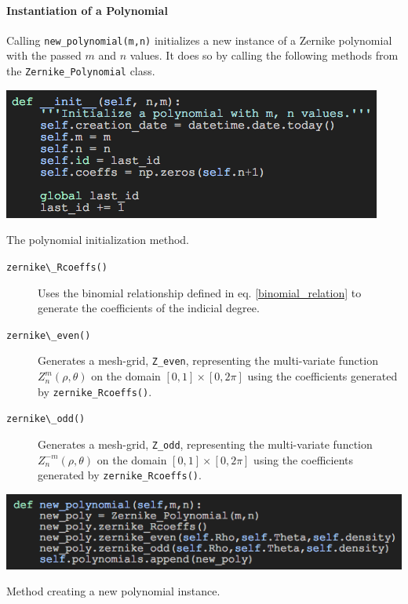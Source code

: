 \documentclass{tufte-handout}
\begin{document}
\paragraph{Instantiation of a Polynomial}
Calling \Verb|new_polynomial(m,n)| initializes a new instance of a Zernike polynomial with the passed $m$ and $n$ values.  It does so by calling the following methods from the \Verb|Zernike_Polynomial| class.

\begin{marginfigure}%
  \includegraphics[width=\linewidth]{img/init.png}
  \caption{The polynomial initialization method.}
  \label{fig:init}
\end{marginfigure}

\begin{description}
\item[\Verb|zernike\_Rcoeffs()|] Uses the binomial relationship defined in eq. \ref{binomial_relation} to generate the coefficients of the indicial degree.
\item[\Verb|zernike\_even()|] Generates a mesh-grid, \Verb|Z_even|, representing the multi-variate function $Z_n^m(\rho,\theta)$ on the domain $[0, 1] \times [0, 2\pi]$ using the coefficients generated by \Verb|zernike_Rcoeffs()|.
\item[\Verb|zernike\_odd()|] Generates a mesh-grid, \Verb|Z_odd|, representing the multi-variate function $Z_n^{-m}(\rho,\theta)$ on the domain $[0, 1] \times [0, 2\pi]$ using the coefficients generated by \Verb|zernike_Rcoeffs()|.
\end{description}

\begin{marginfigure}%
  \includegraphics[width=\linewidth]{img/new_poly.png}
  \caption{Method creating a new polynomial instance.}
  \label{fig:init}
\end{marginfigure}
\end{document}
